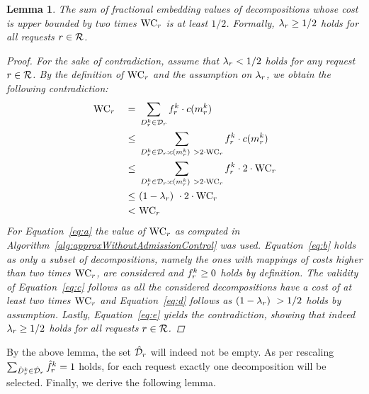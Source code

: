 \documentclass[10pt, conference, letterpaper]{IEEEtran}
\newtheorem{lemma}[theorem]{Lemma}
\begin{document}
\begin{lemma}
\label{lem:wac-pruning}
The sum of fractional embedding values of decompositions whose cost is upper bounded by two times $\WAC$ is at least $1/2$. Formally,
$\lambda_{r} \geq 1/2$  holds for all requests $r \in \mathcal{R}$.
\begin{proof}
For the sake of contradiction, assume that $\lambda_{r} < 1/2$ holds for any request $r \in \mathcal{R}$. By the definition of $\WAC$ and the assumption on $\lambda_{r}$, we obtain the following contradiction:
\begin{alignat}{5}
& \WAC ~& = & ~\sum_{\decomp \in \PotEmbeddings} \prob \cdot c(\mapping)~\label{eq:a}\\
&      & \leq & ~\sum_{\decomp \in \PotEmbeddings: c(\mapping)~> 2 \cdot \WAC} \prob \cdot c(\mapping)~\label{eq:b}\\
&      & \leq  & ~\sum_{\decomp \in \PotEmbeddings: c(\mapping)~> 2 \cdot \WAC} \prob \cdot 2\cdot \WAC \label{eq:c}\\
&      & \leq  & ~(1-\lambda_{\req})~\cdot 2 \cdot \WAC \label{eq:d}\\
&      & < & ~\WAC \label{eq:e}
\end{alignat}
For Equation~\ref{eq:a} the value of $\WAC$ as computed in Algorithm~\ref{alg:approxWithoutAdmissionControl} was used. Equation~\ref{eq:b} holds as only a subset of decompositions, namely the ones with mappings of costs higher than two times $\WAC$, are considered and $\prob \geq 0$ holds by definition. The validity of Equation~\ref{eq:c} follows as all the considered decompositions have a cost of at least two times $\WAC$ and Equation~\ref{eq:d} follows as $(1-\lambda_{r})~> 1/2$ holds by assumption. Lastly, Equation~\ref{eq:e} yields the contradiction, showing that indeed $\lambda_{r} \geq 1/2$ holds for all requests $r \in \mathcal{R}$.
\end{proof}
\end{lemma}

By the above lemma, the set $\PotEmbeddingsHat$ will indeed not be empty. As per rescaling $\sum_{\decompHat \in \PotEmbeddingsHat} \probHat = 1$ holds, for each request exactly one decomposition will be selected. Finally, we derive the following lemma.
\end{document}
